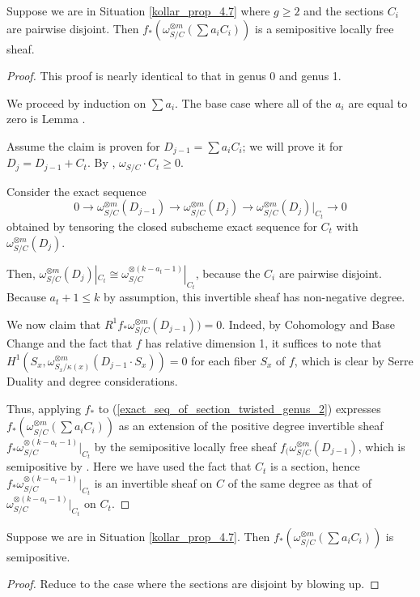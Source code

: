 \begin{lemma}\label{inductive_step_genus_2}
Suppose we are in Situation \ref{kollar_prop_4.7} where $g\ge2$ and the sections $C_i$ are pairwise disjoint.
Then $f_{*}(\omega_{S/C}^{\otimes m}(\sum a_iC_i))$ is a semipositive locally free sheaf.
\end{lemma}
\begin{proof}
This proof is nearly identical to that in genus 0 and genus 1.

We proceed by induction on $\sum a_i$. 
The base case where all of the $a_i$ are equal to zero is Lemma .

Assume the claim is proven for $D_{j-1}=\sum a_iC_i$; we will prove it for $D_{j}=D_{j-1}+C_t$.
By , $\omega_{S/C}\cdot C_t\ge0$.

Consider the exact sequence
\begin{equation*}\label{exact_seq_of_section_twisted_genus_2}
0\to\omega_{S/C}^{\otimes m}(D_{j-1})\to\omega_{S/C}^{\otimes m}(D_j)\to \omega_{S/C}^{\otimes m}(D_j)|_{C_t}\to0
\end{equation*}
obtained by tensoring the closed subscheme exact sequence for $C_t$ with $\omega_{S/C}^{\otimes m}(D_j)$.

Then, $\omega_{S/C}^{\otimes m}(D_j)|_{C_t}\cong \omega_{S/C}^{\otimes (k-a_{t}-1)}|_{C_t}$, because the $C_i$ are pairwise disjoint.
Because $a_{t}+1\le k$ by assumption, this invertible sheaf has non-negative degree.

We now claim that $R^{1}f_{*}\omega_{S/C}^{\otimes m}(D_{j-1}))=0$.
Indeed, by Cohomology and Base Change and the fact that $f$ has relative dimension 1, it suffices to note that $H^{1}(S_x,\omega_{S_x/\kappa(x)}^{\otimes m}(D_{j-1}\cdot S_x))=0$ for each fiber $S_x$ of $f$, which is clear by Serre Duality and degree considerations.

Thus, applying $f_{*}$ to (\ref{exact_seq_of_section_twisted_genus_2}) expresses $f_{*}(\omega_{S/C}^{\otimes m}(\sum a_iC_i))$ as an extension of the positive degree invertible sheaf $f_{*}\omega_{S/C}^{\otimes (k-a_{t}-1)}|_{C_t}$ by the semipositive locally free sheaf $f_{(}\omega_{S/C}^{\otimes m}(D_{j-1})$, which is semipositive by .
Here we have used the fact that $C_t$ is a section, hence $f_{*}\omega_{S/C}^{\otimes (k-a_{t}-1)}|_{C_t}$ is an invertible sheaf on $C$ of the same degree as that of $\omega_{S/C}^{\otimes (k-a_{t}-1)}|_{C_t}$ on $C_t$.
\end{proof}

\begin{lemma}
Suppose we are in Situation \ref{kollar_prop_4.7}.
Then $f_{*}(\omega_{S/C}^{\otimes m}(\sum a_iC_i))$ is semipositive.
\end{lemma}
\begin{proof}
Reduce to the case where the sections are disjoint by blowing up.
\end{proof}





